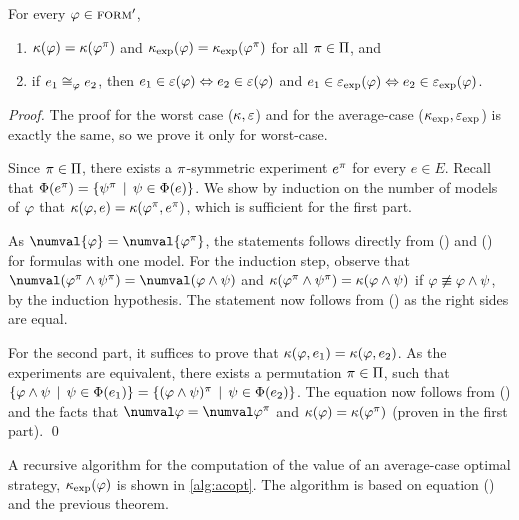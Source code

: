 \begin{theorem}
For every $\varphi\in{\textsc{form}'}$,
\begin{enumerate}
\item $\kappa(\varphi) = \kappa(\varphi^\pi)$ and $\kappa_\textrm{exp}(\varphi) = \kappa_\textrm{exp}(\varphi^\pi)$ for all $\pi\in\Pi$, and
\item if $e_1\cong_{\varphi} e_2$, then $e_1\in\varepsilon(\varphi) \Leftrightarrow e_2\in\varepsilon(\varphi)$ and
  $e_1\in\varepsilon_\textrm{exp}(\varphi) \Leftrightarrow e_2\in\varepsilon_\textrm{exp}(\varphi)$.
\end{enumerate}
\end{theorem}

\begin{proof}
The proof for the worst case ($\kappa, \varepsilon$)
  and for the average-case ($\kappa_\textrm{exp}, \varepsilon_\textrm{exp}$) is exactly the same,
  so we prove it only for worst-case.

Since $\pi\in\Pi$, there exists a $\pi$-symmetric experiment $e^\pi$
  for every $e\in E$.
Recall that $\Phi(e^\pi) = \{ \psi^\pi \:\:|\:\: \psi\in\Phi(e)\}$.
We show by induction on the number of models of $\varphi$
  that $\kappa(\varphi, e) = \kappa(\varphi^\pi, e^\pi)$,
  which is sufficient for the first part.

As $\numval{\form} = \numval{\form^\perm}$, the statements follows directly from
  () and () for formulas with one model.
For the induction step, observe that
  $\numval(\form^\perm \wedge \formx^\perm) = \numval(\form\wedge\formx)$
  and
  $\kappa(\varphi^\pi \wedge \psi^\pi) = \kappa(\varphi\wedge\psi)$
  if $\varphi \not\equiv \varphi\wedge\psi$, by the induction hypothesis.
The statement now follows from ()
  as the right sides are equal.

For the second part, it suffices to prove that
  $\kappa(\varphi, e_1) = \kappa(\varphi, e_2)$.
As the experiments are equivalent, there exists a permutation $\pi\in\Pi$,
 such that
 $\{\varphi\wedge\psi \:\:|\:\:\psi\in\Phi(e_1)\} =
 \{(\varphi\wedge\psi)^\pi \:\:|\:\:\psi\in\Phi(e_2)\}$.
The equation now follows from () and the facts that
 $\numval\form=\numval\form^\perm$ and $\kappa(\varphi) = \kappa(\varphi^\pi)$
 (proven in the first part). \qed
\end{proof}

A recursive algorithm for the computation of the value
  of an average-case optimal strategy,
  $\kappa_\textrm{exp}(\varphi)$ is shown in \autoref{alg:acopt}.
The algorithm is based on equation () and
  the previous theorem.

